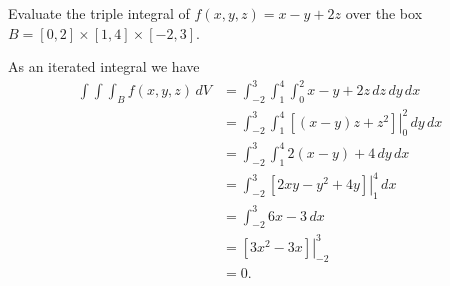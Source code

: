 \begin{activity} \label{A:11.7.2} Evaluate the triple integral of $f(x,y,z) = x-y+2z$ over the box $B = [0,2] \times [1,4] \times [-2,3]$.


\end{activity}
\begin{smallhint}

\end{smallhint}
\begin{bighint}

\end{bighint}
\begin{activitySolution}
As an iterated integral we have
\begin{align*}
\int \int \int_B f(x,y,z) \, dV &= \int_{-2}^3 \int_1^4 \int_0^2 x-y+2z \, dz \, dy \, dx \\
	&= \int_{-2}^3 \int_1^4 \left. \left[ (x-y)z+z^2\right] \right|_0^2 \, dy \, dx \\
	&= \int_{-2}^3 \int_1^4 2(x-y)+4 \, dy \, dx \\
	&= \int_{-2}^3 \left. \left[2xy-y^2+4y\right] \right|_1^4 \, dx \\
	&= \int_{-2}^3 6x-3 \, dx \\
	&= \left. \left[3x^2-3x\right] \right|_{-2}^3 \\
	&= 0.
\end{align*}
\end{activitySolution}
\aftera
